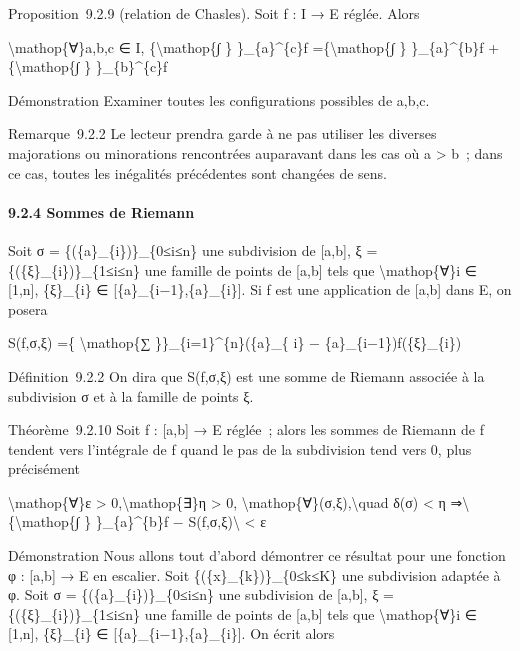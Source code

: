 \documentclass[]{article}
\begin{document}
Proposition~9.2.9 (relation de Chasles). Soit f : I → E réglée. Alors

\textbackslash{}mathop\{∀\}a,b,c ∈ I, \{\textbackslash{}mathop\{∫ \}
\}\_\{a\}\^{}\{c\}f =\{\textbackslash{}mathop\{∫ \} \}\_\{a\}\^{}\{b\}f
+\{\textbackslash{}mathop\{∫ \} \}\_\{b\}\^{}\{c\}f

Démonstration Examiner toutes les configurations possibles de a,b,c.

Remarque~9.2.2 Le lecteur prendra garde à ne pas utiliser les diverses
majorations ou minorations rencontrées auparavant dans les cas où a
\textgreater{} b~; dans ce cas, toutes les inégalités précédentes sont
changées de sens.

\paragraph{9.2.4 Sommes de Riemann}

Soit σ = \{(\{a\}\_\{i\})\}\_\{0≤i≤n\} une subdivision de {[}a,b{]}, ξ =
\{(\{ξ\}\_\{i\})\}\_\{1≤i≤n\} une famille de points de {[}a,b{]} tels
que \textbackslash{}mathop\{∀\}i ∈ {[}1,n{]}, \{ξ\}\_\{i\} ∈
{[}\{a\}\_\{i−1\},\{a\}\_\{i\}{]}. Si f est une application de {[}a,b{]}
dans E, on posera

S(f,σ,ξ) =\{ \textbackslash{}mathop\{∑ \}\}\_\{i=1\}\^{}\{n\}(\{a\}\_\{
i\} − \{a\}\_\{i−1\})f(\{ξ\}\_\{i\})

Définition~9.2.2 On dira que S(f,σ,ξ) est une somme de Riemann associée
à la subdivision σ et à la famille de points ξ.

Théorème~9.2.10 Soit f : {[}a,b{]} → E réglée~; alors les sommes de
Riemann de f tendent vers l'intégrale de f quand le pas de la
subdivision tend vers 0, plus précisément

\textbackslash{}mathop\{∀\}ε \textgreater{}
0,\textbackslash{}mathop\{∃\}η \textgreater{} 0,
\textbackslash{}mathop\{∀\}(σ,ξ),\textbackslash{}quad δ(σ) \textless{} η
⇒\textbackslash{}\textbar{}\{\textbackslash{}mathop\{∫ \}
\}\_\{a\}\^{}\{b\}f − S(f,σ,ξ)\textbackslash{}\textbar{} \textless{} ε

Démonstration Nous allons tout d'abord démontrer ce résultat pour une
fonction φ : {[}a,b{]} → E en escalier. Soit
\{(\{x\}\_\{k\})\}\_\{0≤k≤K\} une subdivision adaptée à φ. Soit σ =
\{(\{a\}\_\{i\})\}\_\{0≤i≤n\} une subdivision de {[}a,b{]}, ξ =
\{(\{ξ\}\_\{i\})\}\_\{1≤i≤n\} une famille de points de {[}a,b{]} tels
que \textbackslash{}mathop\{∀\}i ∈ {[}1,n{]}, \{ξ\}\_\{i\} ∈
{[}\{a\}\_\{i−1\},\{a\}\_\{i\}{]}. On écrit alors
\end{document}
